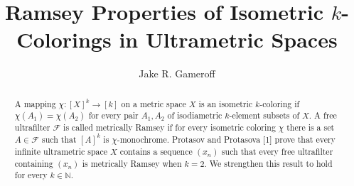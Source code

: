 
\makeatletter
\def\@settitle{\begin{center}%
  \baselineskip14\p@\relax
    \normalfont\Large%
\@title
  \end{center}%
}
\makeatother

\title{Ramsey Properties of Isometric $k$-Colorings in Ultrametric Spaces}
\author{Jake R. Gameroff}

\begin{abstract}
	A mapping \( \chi : [X]^{k} \to [k] \) on a metric space \( X \) is an isometric \( k \)-coloring if \( \chi(A_1) = \chi(A_2) \) for every pair \( A_1,A_2 \) of isodiametric \( k \)-element subsets of \( X \). A free ultrafilter \( \mathcal{F}  \) is called metrically Ramsey if for every isometric coloring \( \chi \) there is a set \( A \in \mathcal{F}  \) such that \( [A]^{k}  \) is \( \chi \)-monochrome. Protasov and Protasova [1] prove that every infinite ultrametric space \( X \) contains a sequence \( (x_{n}) \) such that every free ultrafilter containing \( (x_{n}) \) is metrically Ramsey when \( k = 2 \). We strengthen this result to hold for every \( k \in \mathbb{N}  \).
\end{abstract}
\maketitle




\newpage

